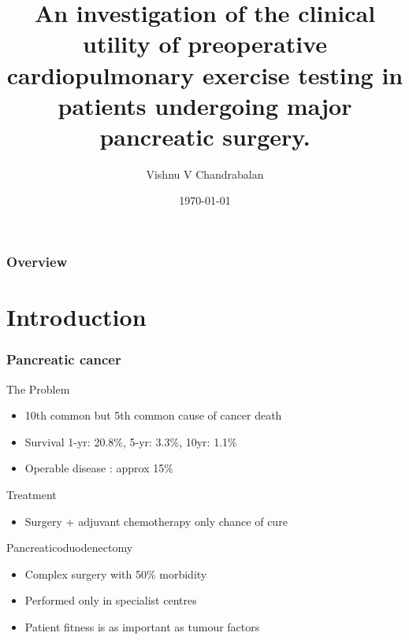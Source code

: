 \documentclass[10pt]{beamer}
\title[Improving Outcomes in Pancreatic Surgery]{An investigation of the clinical utility of preoperative cardiopulmonary exercise testing in patients undergoing major pancreatic surgery.} %
\author{Vishnu V Chandrabalan} %
\institute[UoG] %
{
University of Glasgow \\ %
\medskip
}
\date{\today} %
\begin{document}
\begin{frame}
\titlepage %
\end{frame}

\begin{frame}
\frametitle{Overview} %
\tableofcontents %
\end{frame}


\section[Chapter 1]{Introduction}

\begin{frame}
	\frametitle{Pancreatic cancer} %
	\begin{block}{The Problem}
		\begin{itemize}
			\item 10th common but 5th common cause of cancer death
			\item Survival	1-yr: 20.8\%, 5-yr: 3.3\%, 10yr: 1.1\%
			\item Operable disease : approx 15\%
		\end{itemize}
	\end{block}
	\begin{block}{Treatment}
		\begin{itemize}
			\item Surgery + adjuvant chemotherapy only chance of cure
		\end{itemize}
	\end{block}
	\begin{block}{Pancreaticoduodenectomy}
		\begin{itemize}
			\item Complex surgery with 50\% morbidity
			\item Performed only in specialist centres
			\item Patient fitness is as important as tumour factors
		\end{itemize}
	\end{block}
\end{frame}
\end{document}
